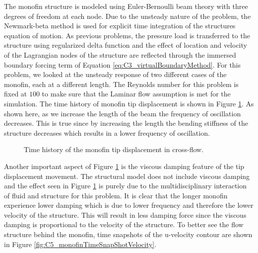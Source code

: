 The monofin structure is modeled using Euler-Bernoulli beam theory with three degrees of freedom at each node. Due to the unsteady nature of the problem, the Newmark-beta method is used for explicit time integration of the structures equation of motion. As previous problems, the pressure load is transferred to the structure using regularized delta function and the effect of location and velocity of the Lagrangian nodes of the structure are reflected through the immersed boundary forcing term of Equation \eqref{eq:C3_virtualBoundaryMethod}. For this problem, we looked at the unsteady response of two different cases of the monofin, each at a different length. The Reynolds number for this problem is fixed at $100$ to make sure that the Laminar flow assumption is met for the simulation. The time history of monofin tip displacement is shown in Figure \ref{fig:C5_timeHistoryTipDisplacement}. As shown here, as we increase the length of the beam the frequency of oscillation decreases. This is true since by increasing the length the bending stiffness of the structure decreases which results in a lower frequency of oscillation.
%
\begin{figure}[H]
    \centering
    \quad
    \caption{Time history of the monofin tip displacement in cross-flow.}
    \label{fig:C5_timeHistoryTipDisplacement}
\end{figure}
%
Another important aspect of Figure \ref{fig:C5_timeHistoryTipDisplacement} is the viscous damping feature of the tip displacement movement. The structural model does not include viscous damping and the effect seen in Figure \ref{fig:C5_timeHistoryTipDisplacement} is purely due to the multidisciplinary interaction of fluid and structure for this problem. It is clear that the longer monofin experience lower damping which is due to lower frequency and therefore the lower velocity of the structure. This will result in less damping force since the viscous damping is proportional to the velocity of the structure. To better see the flow structure behind the monofin, time snapshots of the u-velocity contour are shown in Figure \ref{fig:C5_monofinTimeSnapShotVelocity}.

